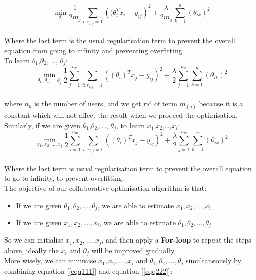 \begin{equation*}
\min_{\theta_{j}} \frac{1}{2m_{j}}\sum_{i:r_{i,j} = 1}\left((\theta_{i}^{T}x_{i}-y_{ij}\right)^{2} + \frac{\lambda}{2m_{j}}\sum_{k = 1}^{n}(\theta_{ik})^{2}
\end{equation*}
\\Where the last term is the usual regularisation term to prevent the overall equation from going to infinity and preventing overfitting.
\\To learn $\theta_{1}$,$\theta_{2}$, \dots, $\theta_{j}$:
\begin{equation}
\label{eqq111}
\min_{\theta_{1},\theta_{2}, \dots, \theta_{j}} \frac{1}{2}\sum_{j = 1}^{n_{u}}\sum_{i:r_{i,j} = 1}\left((\theta_{i})^{T}x_{j}-y_{ij}\right)^{2} + \frac{\lambda}{2}\sum_{j = 1}^{n_{u}}\sum_{k = 1}^{n}(\theta_{ik})^{2}
\end{equation}
\\where $n_{u}$ is the number of users, and we get rid of term $m_{(j)}$ because it is a constant which will not affect the result when we proceed the optimisation.
\\Similarly, if we are given $\theta_{1}$,$\theta_{2}$, \dots, $\theta_{j}$, to learn $x_{1}$,$x_{2}$,\dots,$x_{i}$:
\begin{equation}
\label{eqq222}
\min_{x_{1},x_{2}, \dots,x_{j}} \frac{1}{2}\sum_{i = 1}^{n_{m}}\sum_{i:r_{i,j} = 1}\left((\theta_{i})^{T}x_{j}-y_{ij}\right)^{2} + \frac{\lambda}{2}\sum_{j = 1}^{n_{m}}\sum_{k = 1}^{n}(\theta_{ik})^{2}
\end{equation}
\\Where the last term is usual regularisation term to prevent the overall equation to go to infinity, to prevent overfitting.
\\The objective of our collaborative optimisation algorithm is that:
\begin{itemize}
\item  If we are given $\theta_{1},\theta_{2}, \dots, \theta_{j}$, we are able to estimate $x_{1},x_{2}, \dots,x_{i}$
\item  If we are given $x_{1},x_{2}, \dots,x_{i}$, we are able to estimate $\theta_{1},\theta_{2}, \dots, \theta_{j}$
\end{itemize}
So we can initialise $x_{1},x_{2}, \dots,x_{j}$, and then apply a \textbf{For-loop} to repeat the steps above, ideally the $x_{i}$ and $\theta_{j}$ will be improved gradually. 
\\ More wisely, we can minimise $x_{1},x_{2}, \dots,x_{i}$ and $\theta_{1},\theta_{2}, \dots, \theta_{j}$ simultaneously by combining equation [\ref{eqq111}] and equation [\ref{eqq222}]:
